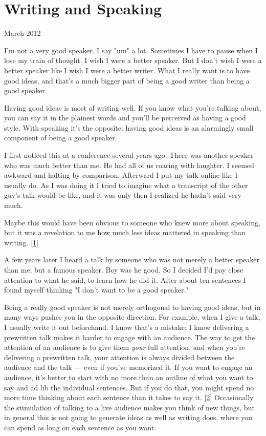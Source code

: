 \chapter{Writing and Speaking}



March 2012

I'm not a very good speaker.  I say "um" a lot. Sometimes I have
to pause when I lose my train of thought.  I wish I were a better
speaker.  But I don't wish I were a better speaker like I wish I
were a better writer.  What I really want is to have good ideas,
and that's a much bigger part of being a good writer than being a
good speaker.

Having good ideas is most of writing well.  If you know what you're
talking about, you can say it in the plainest words and you'll be
perceived as having a good style.  With speaking it's the opposite:
having good ideas is an alarmingly small component of being a good
speaker.

I first noticed this at a conference several years ago.
There was another speaker who was much better than me.
He had all of us roaring with laughter.  I seemed awkward and
halting by comparison.  Afterward I put my talk online like I usually
do.  As I was doing it I tried to imagine what a transcript of the
other guy's talk would be like, and it was only then I realized he
hadn't said very much.

Maybe this would have been obvious to someone who knew more about
speaking, but it was a revelation to me how much less ideas mattered
in speaking than writing.
[\href{\#f1n}{1}]

A few years later I heard a talk by someone who was not merely a
better speaker than me, but a famous speaker.  Boy was he good.  So
I decided I'd pay close attention to what he said, to learn how he
did it.  After about ten sentences I found myself thinking "I don't
want to be a good speaker."

Being a really good speaker is not merely orthogonal to having good ideas,
but in many ways pushes you in the opposite direction.  For example,
when I give a talk, I usually write it out beforehand.  I know that's
a mistake; I know delivering a 
prewritten 
talk makes it harder to
engage with an audience.  The way to get the attention of an audience
is to give them \emph{your} full attention, and when you're delivering
a prewritten talk, your attention is always divided between the
audience and the talk --- even if you've memorized it.  If you want
to engage an audience, it's better to start with no more than an outline
of what you want to say and 
ad lib the individual sentences.  But
if you do that, you might spend no more time thinking about each
sentence than it takes to say it.
[\href{\#f2n}{2}]
Occasionally the stimulation
of talking to a live audience makes you think of new things, but
in general this is not going to generate ideas as well as writing
does, where you can spend as long on each sentence as you want.

